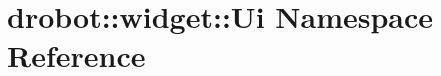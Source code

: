 \hypertarget{namespacedrobot_1_1widget_1_1Ui}{\section{drobot\-:\-:widget\-:\-:Ui Namespace Reference}
\label{namespacedrobot_1_1widget_1_1Ui}
}
